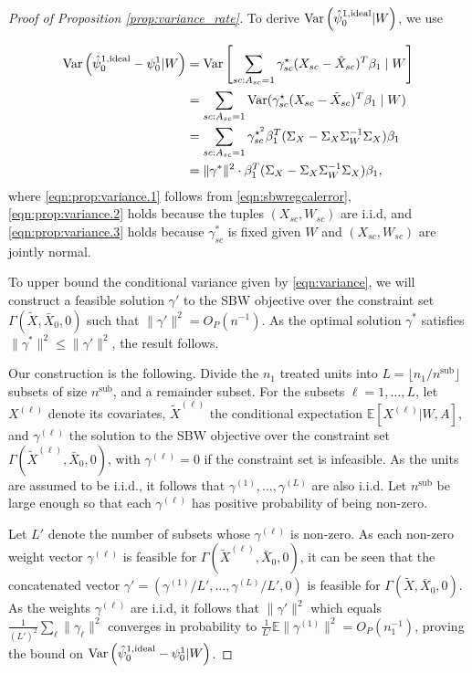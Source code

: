 \begin{proof}[Proof of Proposition \ref{prop:variance_rate}] 
To derive $\operatorname{Var}\left(\hat{\psi}_0^{1,\textup{ideal}} | W\right)$, we use

\begin{align}
\operatorname{Var}\left(\hat{\psi}_0^{1,\textup{ideal}} - \psi_0^1 | W\right) &= \operatorname{Var}\left[\sum_{sc: A_{sc} = 1}\gamma_{sc}^\star(X_{sc} - \tilde{X}_{sc})^T\beta_1 \mid W\right] \label{eqn:prop:variance.1}\\
 &= \sum_{sc: A_{sc} = 1} \operatorname{Var}(\gamma_{sc}^\star(X_{sc} - \tilde{X}_{sc})^T\beta_1 \mid W) \label{eqn:prop:variance.2}\\
 &= \sum_{sc: A_{sc} = 1} \gamma_{sc}^{\star^2}\beta_1^T(\Sigma_{X} - \Sigma_{X}\Sigma_{W}^{-1}\Sigma_{X})\beta_1  \label{eqn:prop:variance.3}\\
& = \|\gamma^*\|^2 \cdot \beta_1^T(\Sigma_{X} - \Sigma_{X}\Sigma_{W}^{-1}\Sigma_{X})\beta_1,  \label{eqn:variance}
\end{align}
%
where \eqref{eqn:prop:variance.1} follows from \eqref{eqn:sbwregcalerror}, \eqref{eqn:prop:variance.2} holds because the tuples $(X_{sc}, W_{sc})$ are i.i.d, and \eqref{eqn:prop:variance.3} holds because $\gamma_{sc}^*$ is fixed given $W$ and $(X_{sc}, W_{sc})$ are jointly normal. 

To upper bound the conditional variance given by \eqref{eqn:variance}, we will construct a feasible solution $\gamma'$ to the SBW objective over the constraint set $\Gamma(\tilde{X}, \bar{X}_0, 0)$ such that $\|\gamma'\|^2 = O_P(n^{-1})$. As the optimal solution $\gamma^*$ satisfies $\|\gamma^*\|^2 \leq \|\gamma'\|^2$, the result follows.

Our construction is the following. Divide the $n_1$ treated units into $L = \lfloor n_1/n^{\text{sub}} \rfloor$ subsets of size $n^{\text{sub}}$, and a remainder subset. For the subsets $\ell=1,\ldots,L$, let $X^{(\ell)}$ denote its covariates, $\tilde{X}^{(\ell)}$ the conditional expectation $\mathbb{E}[X^{(\ell)}|W, A]$, and  $\gamma^{(\ell)}$ the solution to the SBW objective over the constraint set $\Gamma(\tilde{X}^{(\ell)}, \bar{X}_0, 0)$, with $\gamma^{(\ell)}=0$ if the constraint set is infeasible. As the units are assumed to be i.i.d., it follows that $\gamma^{(1)}, \ldots, \gamma^{(L)}$ are also i.i.d. Let $n^{\text{sub}}$ be large enough so that each $\gamma^{(\ell)}$ has positive probability of being non-zero. 

Let $L'$ denote the number of subsets whose $\gamma^{(\ell)}$ is non-zero. As each non-zero weight vector $\gamma^{(\ell)}$ is feasible for $\Gamma(\tilde{X}^{(\ell)}, \bar{X}_0, 0)$, it can be seen that the concatenated vector $\gamma' = (\gamma^{(1)}/L', \ldots, \gamma^{(L)}/L', 0)$ is feasible for $\Gamma(\tilde{X},\bar{X}_0,0)$. As the weights $\gamma^{(\ell)}$ are i.i.d, it follows that $\| \gamma'\|^2$ which equals $\frac{1}{(L')^2} \sum_\ell \|\gamma_\ell\|^2$  converges in probability to $\frac{1}{L'} \mathbb{E}\|\gamma^{(1)}\|^2 = O_P(n_1^{-1})$, proving the bound on $\operatorname{Var}\left(\hat{\psi}_0^{1,\textup{ideal}} - \psi_0^1 | W\right)$.


\end{proof}
